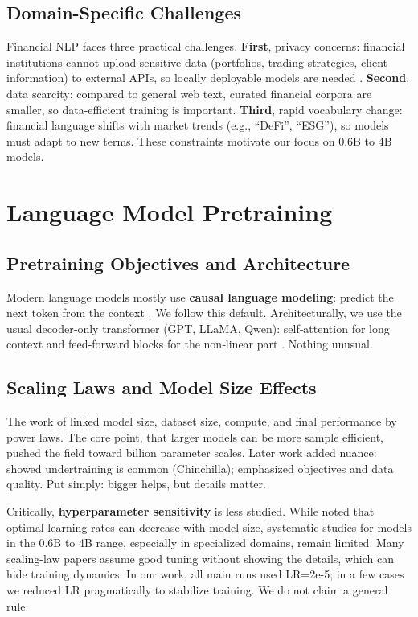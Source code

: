 \subsection{Domain-Specific Challenges}

Financial NLP faces three practical challenges. \textbf{First}, privacy concerns: financial institutions cannot upload sensitive data (portfolios, trading strategies, client information) to external APIs, so locally deployable models are needed \parencite{wu2023bloomberggpt}. \textbf{Second}, data scarcity: compared to general web text, curated financial corpora are smaller, so data-efficient training is important. \textbf{Third}, rapid vocabulary change: financial language shifts with market trends (e.g., ``DeFi'', ``ESG''), so models must adapt to new terms. These constraints motivate our focus on 0.6B to 4B models.

\section{Language Model Pretraining}

\subsection{Pretraining Objectives and Architecture}

Modern language models mostly use \textbf{causal language modeling}: predict the next token from the context \parencite{radford2019language, brown2020language}. We follow this default. Architecturally, we use the usual decoder‑only transformer (GPT, LLaMA, Qwen): self‑attention for long context and feed‑forward blocks for the non‑linear part \parencite{vaswani2017attention, touvron2023llama}. Nothing unusual.

\subsection{Scaling Laws and Model Size Effects}

The work of \textcite{kaplan2020scaling} linked model size, dataset size, compute, and final performance by power laws. The core point, that larger models can be more sample efficient, pushed the field toward billion parameter scales. Later work added nuance: \textcite{hoffmann2022training} showed undertraining is common (Chinchilla); \textcite{tay2022ul2} emphasized objectives and data quality. Put simply: bigger helps, but details matter.

Critically, \textbf{hyperparameter sensitivity} is less studied. While \textcite{mccandlish2018empirical} noted that optimal learning rates can decrease with model size, systematic studies for models in the 0.6B to 4B range, especially in specialized domains, remain limited. Many scaling-law papers assume good tuning without showing the details, which can hide training dynamics. In our work, all main runs used LR=2e-5; in a few cases we reduced LR pragmatically to stabilize training. We do not claim a general rule.

